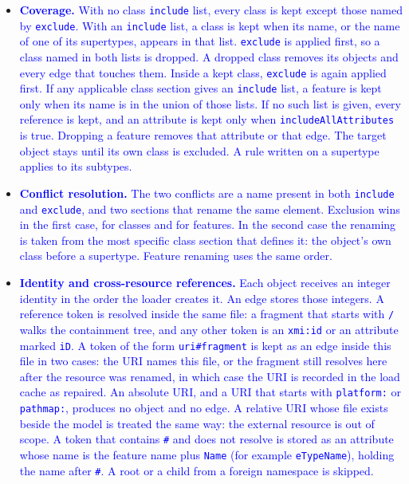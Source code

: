 \documentclass[journal,article,submit,moreauthors,technologies]{Definitions/mdpi}
\newcommand{\rev}[1]{\textcolor{blue}{#1}}
\begin{document}
\begin{itemize}
    \item \rev{\textbf{Coverage.} With no class \texttt{include} list, every class is kept except those named by \texttt{exclude}. With an \texttt{include} list, a class is kept when its name, or the name of one of its supertypes, appears in that list. \texttt{exclude} is applied first, so a class named in both lists is dropped. A dropped class removes its objects and every edge that touches them. Inside a kept class, \texttt{exclude} is again applied first. If any applicable class section gives an \texttt{include} list, a feature is kept only when its name is in the union of those lists. If no such list is given, every reference is kept, and an attribute is kept only when \texttt{includeAllAttributes} is true. Dropping a feature removes that attribute or that edge. The target object stays until its own class is excluded. A rule written on a supertype applies to its subtypes.}
    \item \rev{\textbf{Conflict resolution.} The two conflicts are a name present in both \texttt{include} and \texttt{exclude}, and two sections that rename the same element. Exclusion wins in the first case, for classes and for features. In the second case the renaming is taken from the most specific class section that defines it: the object's own class before a supertype. Feature renaming uses the same order.}
    \item \rev{\textbf{Identity and cross-resource references.} Each object receives an integer identity in the order the loader creates it. An edge stores those integers. A reference token is resolved inside the same file: a fragment that starts with \texttt{/} walks the containment tree, and any other token is an \texttt{xmi:id} or an attribute marked \texttt{iD}. A token of the form \texttt{uri\#fragment} is kept as an edge inside this file in two cases: the URI names this file, or the fragment still resolves here after the resource was renamed, in which case the URI is recorded in the load cache as repaired. An absolute URI, and a URI that starts with \texttt{platform:} or \texttt{pathmap:}, produces no object and no edge. A relative URI whose file exists beside the model is treated the same way: the external resource is out of scope. A token that contains \texttt{\#} and does not resolve is stored as an attribute whose name is the feature name plus \texttt{Name} (for example \texttt{eTypeName}), holding the name after \texttt{\#}. A root or a child from a foreign namespace is skipped.}

\end{itemize}
\end{document}
